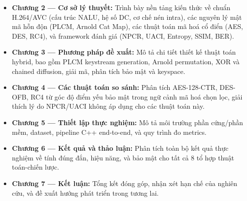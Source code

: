 \begin{itemize}
  \item \textbf{Chương 2 --- Cơ sở lý thuyết:} Trình bày nền tảng kiến thức về
        chuẩn H.264/AVC (cấu trúc NALU, hệ số DC, cơ chế nén intra), các nguyên
        lý mật mã hỗn độn (PLCM, Arnold Cat Map), các thuật toán mã hoá cổ điển
        (AES, DES, RC4), và framework đánh giá (NPCR, UACI, Entropy, SSIM, BER).

  \item \textbf{Chương 3 --- Phương pháp đề xuất:} Mô tả chi tiết thiết kế
        thuật toán hybrid, bao gồm PLCM keystream generation, Arnold permutation,
        XOR và chained diffusion, giải mã, phân tích bảo mật và keyspace.

  \item \textbf{Chương 4 --- Các thuật toán so sánh:} Phân tích AES-128-CTR,
        DES-OFB, RC4 từ góc độ điểm yếu bảo mật trong ngữ cảnh mã hoá chọn lọc,
        giải thích lý do NPCR/UACI không áp dụng cho các thuật toán này.

  \item \textbf{Chương 5 --- Thiết lập thực nghiệm:} Mô tả môi trường phần
        cứng/phần mềm, dataset, pipeline C++ end-to-end, và quy trình đo metrics.

  \item \textbf{Chương 6 --- Kết quả và thảo luận:} Phân tích toàn bộ kết quả
        thực nghiệm về tính đúng đắn, hiệu năng, và bảo mật cho tất cả
        8 tổ hợp thuật toán-chiến lược.

  \item \textbf{Chương 7 --- Kết luận:} Tổng kết đóng góp, nhận xét hạn chế
        của nghiên cứu, và đề xuất hướng phát triển trong tương lai.
\end{itemize}
